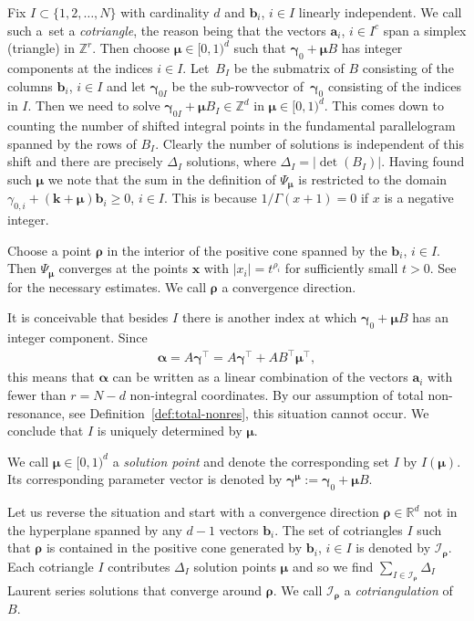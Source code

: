 \documentclass[pdftex]{sigma}
\numberwithin{equation}{section}
\begin{document}
Fix $I\subset\{1,2,\dots,N\}$ with cardinality $d$ and $\bm{b}_i$, $i\in I$ linearly
independent. We call such a~set a {\it cotriangle}, the reason being that
the vectors $\bm{a}_i$, $i\in I^c$ span a simplex (triangle) in $\mathbb{Z}^r$.
Then choose $\bm\mu\in[0,1)^d$ such that $\bm\gamma_0+\bm\mu B$ has integer components at the indices $i\in I$. Let~$B_I$ be the submatrix of $B$ consisting of the
columns $\bm{b}_i$, $i\in I$ and let $\bm\gamma_{0I}$ be the sub-rowvector of~$\bm{\gamma}_0$ consisting of the indices in $I$. Then we need to solve $\bm\gamma_{0I}+\bm\mu B_I\in\mathbb{Z}^d$ in $\bm\mu\in
[0,1)^d$. This comes down to counting the number of shifted integral points in the fundamental
parallelogram spanned by the rows of $B_I$. Clearly the number of solutions is independent of this shift and there are precisely $\Delta_I$ solutions, where $\Delta_I=|\det(B_I)|$. Having found such $\bm\mu$ we note that the sum in
the definition of $\Psi_{\bm\mu}$ is restricted to the domain $\gamma_{0,i}+(\bm{k}+\bm\mu)
\bm{b}_i\ge0$, $i\in I$. This is because $1/\Gamma(x+1)=0$ if $x$ is a negative integer.

Choose a point $\bm\rho$ in the interior of the positive cone spanned by the $\bm{b}_i$, $i\in I$.
Then $\Psi_{\bm\mu}$ converges at the points $\bm{x}$ with $|x_i|=t^{\rho_i}$ for
sufficiently small $t>0$. See \cite{Beu11} for the necessary estimates.
We call $\bm\rho$ a convergence direction.

It is conceivable that besides $I$ there is another index at which $\bm\gamma_0+\bm\mu B$ has
an integer component. Since
\begin{gather*}
\bm\alpha=A\bm\gamma^\intercal=A\bm\gamma^\intercal+AB^\intercal\bm\mu^\intercal,
\end{gather*}
this means that $\bm\alpha$ can be written as a linear combination of the vectors $\bm{a}_i$
with fewer than $r=N-d$ non-integral coordinates. By our assumption of total non-resonance,
see Definition~\ref{def:total-nonres}, this situation cannot occur. We conclude that $I$
is uniquely determined by $\bm\mu$.

\begin{Definition}
We call $\bm\mu\in[0,1)^d$ a {\it solution point} and denote the corresponding set $I$ by $I(\bm\mu)$. Its corresponding parameter vector is denoted by $\bm{\gamma}^{\bm{\mu}} := \bm\gamma_0+\bm\mu B$.
\end{Definition}

Let us reverse the situation and start with a convergence direction $\bm\rho\in\mathbb{R}^d$
not in the hyperplane spanned by any $d-1$ vectors $\bm{b}_i$. The set of cotriangles
$I$ such that $\bm\rho$ is contained in the positive cone generated by $\bm{b}_i$, $i\in I$
is denoted by $\mathcal{I}_{\bm\rho}$. Each cotriangle $I$ contributes $\Delta_I$ solution
points $\bm\mu$ and so we find $\sum_{I\in\mathcal{I}_{\bm\rho}}\Delta_I$ Laurent series
solutions that converge around $\bm\rho$. We call $\mathcal{I}_{\bm\rho}$ a
{\it cotriangulation} of $B$.
\end{document}
